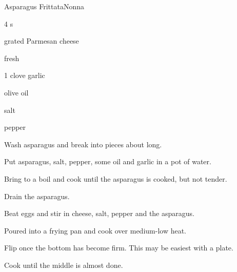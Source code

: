 \begin{recipe}{Asparagus Frittata}{Nonna}{}

\begin{ingredients}
\item 4 s
\item grated Parmesan cheese
\item \C{1 \half} fresh 
\item 1 clove garlic
\item olive oil
\item salt
\item pepper
\end{ingredients}

\begin{directions}
\item Wash asparagus and break into pieces about  long.
\item Put asparagus, salt, pepper, some oil and garlic in a pot of water.
\item Bring to a boil and cook until the asparagus is cooked, but not tender.
\item Drain the asparagus.
\item Beat eggs and stir in cheese, salt, pepper and the asparagus.
\item Poured into a frying pan and cook over medium-low heat.
\item Flip once the bottom has become firm. This may be easiest with a plate.
\item Cook until the middle is almost done.
\end{directions}

\end{recipe}
